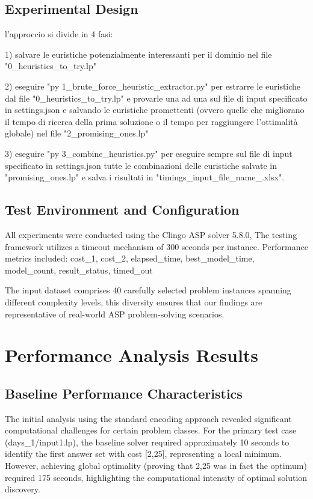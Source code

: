\documentclass[11pt,a4paper]{article}
\begin{document}
\subsection{Experimental Design}

l'approccio si divide in 4 fasi:

1) salvare le euristiche potenzialmente interessanti per il dominio nel file "0_heuristics_to_try.lp"

2) eseguire "py 1_brute_force_heuristic_extractor.py" per estrarre le euristiche dal file "0_heuristics_to_try.lp" e provarle una ad una sul file di input specificato in settings.json e salvando le euristiche promettenti (ovvero quelle che migliorano il tempo di ricerca della prima soluzione o il tempo per raggiungere l'ottimalità globale) nel file "2_promising_ones.lp"

3) eseguire "py 3_combine_heuristics.py" per eseguire sempre sul file di input specificato in settings.json tutte le combinazioni delle euristiche salvate in "promising_ones.lp" e salva i risultati in "timings_{input_file_name}_.xlsx".

\subsection{Test Environment and Configuration}

All experiments were conducted using the Clingo ASP solver 5.8.0,
The testing framework utilizes a timeout mechanism of 300 seconds per instance.
Performance metrics included:
cost_1, cost_2, elapsed_time, best_model_time, model_count, result_status, timed_out

The input dataset comprises 40 carefully selected problem instances spanning different complexity levels, this diversity ensures that our findings are representative of real-world ASP problem-solving scenarios.

\section{Performance Analysis Results}

\subsection{Baseline Performance Characteristics}

The initial analysis using the standard encoding approach revealed significant computational challenges for certain problem classes.
For the primary test case (days_1/input1.lp), the baseline solver required approximately 10 seconds to identify the first answer set with cost [2,25], representing a local minimum.
However, achieving global optimality (proving that 2,25 was in fact the optimum) required 175 seconds, highlighting the computational intensity of optimal solution discovery.
\end{document}
